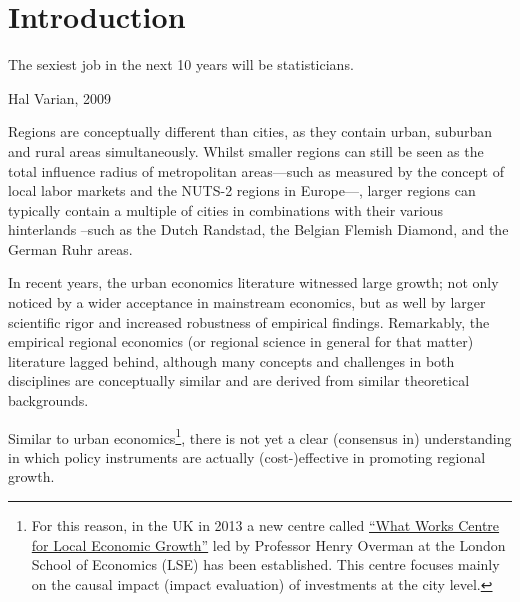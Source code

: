 \documentclass[fleqn,10pt]{SelfArx} %
\affiliation{\textsuperscript{1}\textit{Department of Spatial Economics, Vrije Universiteit Amsterdam, Amsterdam, The Netherlands}} %
\affiliation{*\textbf{Corresponding author}: \Letter{} t.de.graaff@vu.n; \Mundus{} \href{thomasdegraaff.nl}{thomasdegraaff.nl}} %
\begin{document}
\flushbottom %
\maketitle %
\tableofcontents %
\thispagestyle{empty} %


\section*{Introduction} %


\epigraph{The sexiest job in the next 10 years will be statisticians.}{Hal Varian, 2009}

Regions are conceptually different than cities, as they contain urban, suburban and rural areas simultaneously. Whilst smaller regions can still be seen as the total influence radius of metropolitan areas---such as measured by the concept of local labor markets and the NUTS-2 regions in Europe---, larger regions can typically contain a multiple of cities in combinations with their various hinterlands --such as the Dutch Randstad, the Belgian Flemish Diamond, and the German Ruhr areas. 

In recent years, the urban economics literature witnessed large growth; not only noticed by a wider acceptance in mainstream economics, but as well by larger scientific rigor and increased robustness of empirical findings. Remarkably, the empirical regional economics (or regional science in general for that matter) literature lagged behind, although many concepts and challenges in both disciplines are conceptually similar and are derived from similar theoretical backgrounds. 

Similar to urban economics\footnote{For this reason, in the UK in 2013 a new centre called \href{http://www.whatworksgrowth.org/}{``What Works Centre for Local Economic Growth''} led by Professor Henry Overman at the London School of Economics (LSE) has been established. This centre focuses mainly on the causal impact (impact evaluation) of investments at the city level.}, there is not yet a clear (consensus in) understanding in which policy instruments are actually (cost-)effective in promoting regional growth. 
\end{document}
